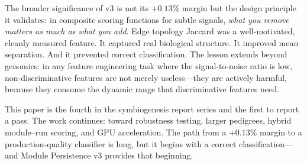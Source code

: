 \documentclass{../yalumba}
\begin{document}
The broader significance of v3 is not its $+0.13\%$ margin but the design
principle it validates: in composite scoring functions for subtle signals,
\emph{what you remove matters as much as what you add}.  Edge topology Jaccard
was a well-motivated, cleanly measured feature.  It captured real biological
structure.  It improved mean separation.  And it prevented correct
classification.  The lesson extends beyond genomics: in any feature engineering
task where the signal-to-noise ratio is low, non-discriminative features are
not merely useless---they are actively harmful, because they consume the
dynamic range that discriminative features need.

This paper is the fourth in the symbiogenesis report series and the first to
report a pass.  The work continues: toward robustness testing, larger
pedigrees, hybrid module--run scoring, and GPU acceleration.  The path from
a $+0.13\%$ margin to a production-quality classifier is long, but it begins
with a correct classification---and Module Persistence v3 provides that
beginning.



\end{document}
